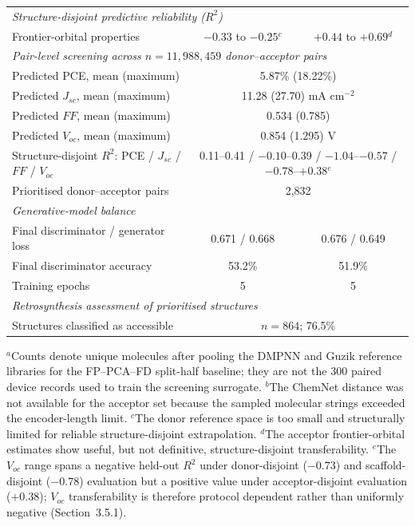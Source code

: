 \documentclass[12pt]{article}
\begin{document}
\begin{table}[!htb]
\begin{tabular}{lcc}
\hline
\multicolumn{3}{l}{\textit{Structure-disjoint predictive reliability ($R^2$)}} \\
Frontier-orbital properties & $-0.33$ to $-0.25$$^{c}$ & $+0.44$ to $+0.69$$^{d}$ \\
\hline
\multicolumn{3}{l}{\textit{Pair-level screening across $n=11{,}988{,}459$ donor--acceptor pairs}} \\
Predicted PCE, mean (maximum) & \multicolumn{2}{c}{5.87\% (18.22\%)} \\
Predicted $J_{sc}$, mean (maximum) & \multicolumn{2}{c}{11.28 (27.70) mA cm$^{-2}$} \\
Predicted $FF$, mean (maximum) & \multicolumn{2}{c}{0.534 (0.785)} \\
Predicted $V_{oc}$, mean (maximum) & \multicolumn{2}{c}{0.854 (1.295) V} \\
Structure-disjoint $R^2$: PCE / $J_{sc}$ / $FF$ / $V_{oc}$ & \multicolumn{2}{c}{0.11--0.41 / $-0.10$--0.39 / $-1.04$--$-0.57$ / $-0.78$--$+0.38$$^{e}$} \\
Prioritised donor--acceptor pairs & \multicolumn{2}{c}{2{,}832} \\
\hline
\multicolumn{3}{l}{\textit{Generative-model balance}} \\
Final discriminator / generator loss & 0.671 / 0.668 & 0.676 / 0.649 \\
Final discriminator accuracy & 53.2\% & 51.9\% \\
Training epochs & 5 & 5 \\
\hline
\multicolumn{3}{l}{\textit{Retrosynthesis assessment of prioritised structures}} \\
Structures classified as accessible & \multicolumn{2}{c}{$n=864$; 76.5\%} \\
\hline
\end{tabular}
\par\vspace{3pt}
\parbox{\textwidth}{\scriptsize
$^{a}$Counts denote unique molecules after pooling the DMPNN and Guzik reference libraries for the FP--PCA--FD split-half baseline; they are not the 300 paired device records used to train the screening surrogate.
$^{b}$The ChemNet distance was not available for the acceptor set because the sampled molecular strings exceeded the encoder-length limit.
$^{c}$The donor reference space is too small and structurally limited for reliable structure-disjoint extrapolation.
$^{d}$The acceptor frontier-orbital estimates show useful, but not definitive, structure-disjoint transferability.
$^{e}$The $V_{oc}$ range spans a negative held-out $R^2$ under donor-disjoint ($-0.73$) and scaffold-disjoint ($-0.78$) evaluation but a positive value under acceptor-disjoint evaluation ($+0.38$); $V_{oc}$ transferability is therefore protocol dependent rather than uniformly negative (Section~3.5.1).}
\end{table}


\clearpage


\end{document}

